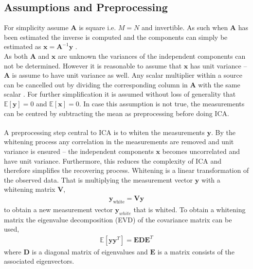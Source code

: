 \subsection{Assumptions and Preprocessing}
For simplicity assume $\mathbf{A}$ is square i.e. $M = N$ and invertible. 
As such when $\mathbf{A}$ has been estimated the inverse is computed and the components can simply be estimated as $\mathbf{x} = \mathbf{A}^{-1} \mathbf{y}$ \cite[p. 152-153]{ICA}.
\\ 
As both $\mathbf{A}$ and $\mathbf{x}$ are unknown the variances of the independent components can not be determined. 
However it is reasonable to assume that $\mathbf{x}$ has unit variance -- $\mathbf{A}$ is assume to have unit variance as well. 
Any scalar multiplier within a source can be cancelled out by dividing the corresponding column in $\mathbf{A}$ with the same scalar \cite[p. 154]{ICA}.
For further simplification it is assumed without loss of generality that $\mathbb{E}[\mathbf{y}] = 0$ and $\mathbb{E}[\mathbf{x}] = 0$\cite[p. 154]{ICA}. 
In case this assumption is not true, the measurements can be centred by subtracting the mean as preprocessing before doing ICA.
\\ \\
A preprocessing step central to ICA is to whiten the measurements $\mathbf{y}$. 
By the whitening process any correlation in the measurements are removed and unit variance is ensured -- the independent components $\mathbf{x}$ becomes uncorrelated and have unit variance. 
Furthermore, this reduces the complexity of ICA and therefore simplifies the recovering process.
Whitening is a linear transformation of the observed data. 
That is multiplying the measurement vector $\textbf{y}$ with a whitening matrix $\textbf{V}$,
\begin{align*}
\textbf{y}_{\text{white}} = \textbf{V}\textbf{y}
\end{align*} 
to obtain a new measurement vector $\textbf{y}_{white}$ that is whited. 
To obtain a whitening matrix the eigenvalue decomposition (EVD) of the covariance matrix can be used,
\begin{align*}
\mathbb{E}[\mathbf{yy}^T] = \mathbf{EDE}^T
\end{align*}
where $\mathbf{D}$ is a diagonal matrix of eigenvalues and $\mathbf{E}$ is a matrix consists of the associated eigenvectors. 
